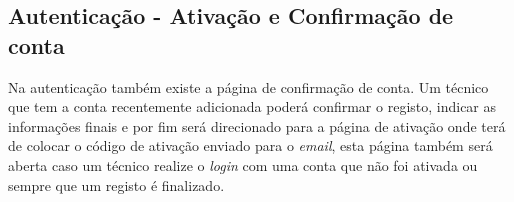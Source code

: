 \newpage

\subsection{Autenticação - Ativação e Confirmação de conta}

Na autenticação também existe a página de confirmação de conta. Um técnico que tem a conta recentemente adicionada poderá confirmar o registo, indicar as informações finais e por fim será direcionado para a página de ativação onde terá de colocar o código de ativação enviado para o \textit{email}, esta página também será aberta caso um técnico realize o \textit{login} com uma conta que não foi ativada ou sempre que um registo é finalizado.

\begin{figure}[htb]%
  \centering
  \qquad

\end{figure}
